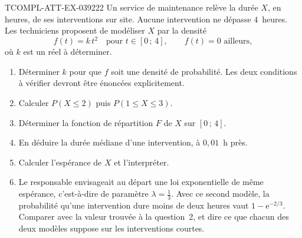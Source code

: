 \begin{exercice}{TCOMPL-ATT-EX-039}{2}{22}
Un service de maintenance relève la durée $X$, en heures, de ses interventions
sur site. Aucune intervention ne dépasse $4$~heures. Les techniciens proposent de
modéliser $X$ par la densité
\[
  f(t)=k\,t^2 \quad\text{pour } t\in[0\,;\,4], \qquad f(t)=0 \text{ ailleurs},
\]
où $k$ est un réel à déterminer.
\begin{enumerate}
  \item Déterminer $k$ pour que $f$ soit une densité de probabilité. Les deux
    conditions à vérifier devront être énoncées explicitement.
  \item Calculer $P(X\leqslant 2)$ puis $P(1\leqslant X\leqslant 3)$.
  \item Déterminer la fonction de répartition $F$ de $X$ sur $[0\,;\,4]$.
  \item En déduire la durée médiane d'une intervention, à $0{,}01$~h près.
  \item Calculer l'espérance de $X$ et l'interpréter.
  \item Le responsable envisageait au départ une loi exponentielle de même
    espérance, c'est-à-dire de paramètre $\lambda=\tfrac13$. Avec ce second
    modèle, la probabilité qu'une intervention dure moins de deux heures vaut
    $1-\mathrm{e}^{-2/3}$. Comparer avec la valeur trouvée à la question~2, et
    dire ce que chacun des deux modèles suppose sur les interventions courtes.
\end{enumerate}
\end{exercice}
